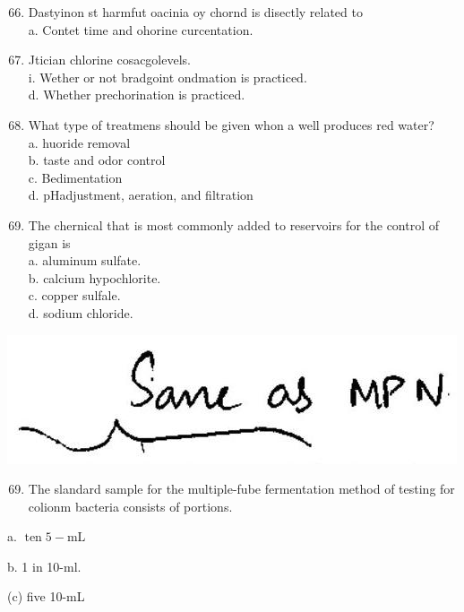\documentclass[10pt]{article}
\begin{document}
\begin{enumerate}
  \setcounter{enumi}{65}
  \item Dastyinon st harmfut oacinia oy chornd is disectly related to\\
a. Contet time and ohorine curcentation.

  \item Jtician chlorine cosacgolevels.\\
i. Wether or not bradgoint ondmation is practiced.\\
d. Whether prechorination is practiced.

  \item What type of treatmens should be given whon a well produces red water?\\
a. huoride removal\\
b. taste and odor control\\
c. Bedimentation\\
d. pHadjustment, aeration, and filtration

  \item The chernical that is most commonly added to reservoirs for the control of gigan is\\
a. aluminum sulfate.\\
b. calcium hypochlorite.\\
c. copper sulfale.\\
d. sodium chloride.

\end{enumerate}

\includegraphics[max width=\textwidth]{2022_11_11_ca6a6c1a0324ee23e523g-11(3)}

\begin{enumerate}
  \setcounter{enumi}{68}
  \item The slandard sample for the multiple-fube fermentation method of testing for colionm bacteria consists of portions.
\end{enumerate}

a. $\operatorname{ten} 5-\mathrm{mL}$

b. 1 in 10-ml.

(c) five 10-mL
\end{document}
